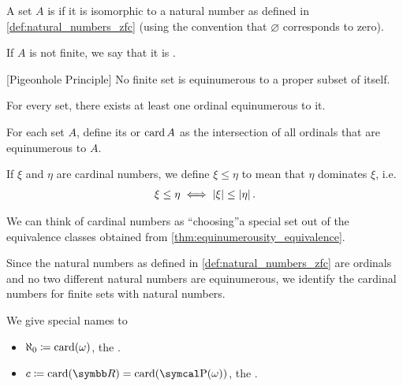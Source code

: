 \begin{definition}\label{def:finite_set}\cite[133]{Enderton1977}
  A set \( A \) is  if it is isomorphic to a natural number as defined in \cref{def:natural_numbers_zfc} (using the convention that \( \varnothing \) corresponds to zero).

  If \( A \) is not finite, we say that it is .
\end{definition}

\begin{theorem}\label{def:pigeonhole_principle}[Pigeonhole Principle]\cite[Corollary 6C]{Enderton1977}
  No finite set is equinumerous to a proper subset of itself.
\end{theorem}

\begin{theorem}\label{thm:equinumerous_ordinal_existence}\cite[197]{Enderton1977}
  For every set, there exists at least one ordinal equinumerous to it.
\end{theorem}

\begin{definition}\label{def:cardinal}\cite[197]{Enderton1977}
  For each set \( A \), define its  or  \( \operatorname{card} A \) as the intersection of all ordinals that are equinumerous to \( A \).

  If \( \xi \) and \( \eta \) are cardinal numbers, we define \( \xi \leq \eta \) to mean that \( \eta \) dominates \( \xi \), i.e.
  \begin{align*}
    \xi \leq \eta \iff \left\vert \xi \right\vert \leq \left\vert \eta \right\vert.
  \end{align*}
\end{definition}

\begin{note}\label{note:cardinals}
  We can think of cardinal numbers as \enquote{choosing}\AOC a special set out of the equivalence classes obtained from \cref{thm:equinumerousity_equivalence}.

  Since the natural numbers as defined in \cref{def:natural_numbers_zfc} are ordinals and no two different natural numbers are equinumerous, we identify the cardinal numbers for finite sets with natural numbers.

  We give special names to
  \begin{itemize}
    \item \( \aleph_0 \coloneqq \operatorname{card}(\omega) \), the .
    \item \( c \coloneqq \Card(\BB{R}) = \Card(\Power(\omega)) \), the .
  \end{itemize}
\end{note}

